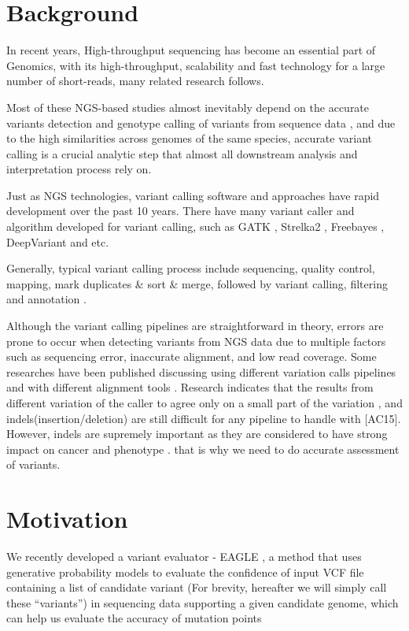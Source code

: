 \hspace{24pt}

\section{Background}
In recent years, High-throughput sequencing has become an essential part of Genomics, with its high-throughput, scalability and fast technology for a large number of short-reads, many related research follows.

Most of these NGS-based studies almost inevitably depend on the accurate variants detection and genotype calling of variants from sequence data \cite{nielsen2011genotype}, and due to the high similarities across genomes of the same species, accurate variant calling is a crucial analytic step that almost all downstream analysis and interpretation process rely on. 

Just as NGS technologies, variant calling software and approaches have rapid development over the past 10 years. There have many variant caller and algorithm developed for variant calling, such as GATK  \cite{poplin2018scaling}, Strelka2 \cite{saunders2012strelka}, Freebayes  \cite{garrison2012haplotype}, DeepVariant \cite{poplin2018universal} and etc.

Generally, typical variant calling process include sequencing, quality control, mapping, mark duplicates \& sort \& merge, followed by variant calling, filtering and annotation \cite{koboldt2020best}.

Although the variant calling pipelines are straightforward in theory, errors are prone to occur when detecting variants from NGS data due to multiple factors such as sequencing error, inaccurate alignment, and low read coverage. Some researches have been published discussing using different variation calls pipelines \cite{bian2018comparing} \cite{chen2019systematic} and with different alignment tools \cite{hwang2015systematic} \cite{zhao2020accuracy}. Research indicates that the results from different variation of the caller to agree only on a small part of the variation \cite{tian2015computational}, and indels(insertion/deletion) are still difficult for any pipeline to handle with [AC15]. However, indels are supremely important as they are considered to have strong impact on cancer\cite{sehn2015insertions} and phenotype \cite{montgomery2013origin}. that is why we need to do accurate assessment of variants.

\section{Motivation}	
We recently developed a variant evaluator - EAGLE \cite{kuo2018eagle}, a method that uses generative probability models to evaluate the confidence of input VCF file containing a list of candidate variant (For brevity, hereafter we will simply call these “variants”) in sequencing data supporting a given candidate genome, which can help us evaluate the accuracy of mutation points

